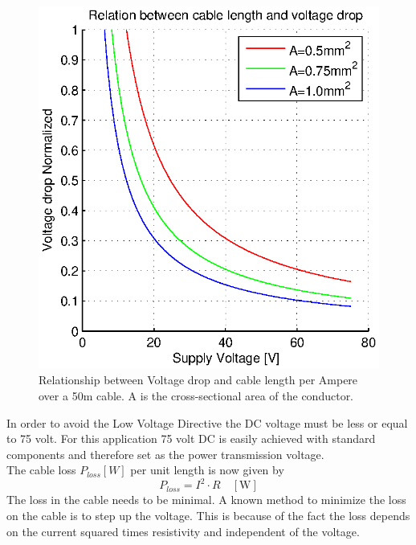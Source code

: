 \begin{figure}[hbtp]
\centering
\includegraphics[scale=0.75]{graphics/matlab/cable_relation_voltage_drop.eps}
\caption[Relationship between Voltage drop and cable length per Ampere]{Relationship between Voltage drop and cable length per Ampere over a 50m cable. A is the cross-sectional area of the conductor.}
\label{fig:relation_voltage_drop}
\end{figure}

\noindent
In order to avoid the Low Voltage Directive \cite{Parliament2006} the DC voltage must be less or equal to 75 volt. For this application 75 volt DC is easily achieved with standard components and therefore set as the power transmission voltage. \\

\noindent
The cable loss $P_{loss}[W]$ per unit length is now given by
\begin{equation}
P_{loss} = I^2 \cdot R \quad [\mathrm{W}]
\end{equation}
\noindent
The loss in the cable needs to be minimal. A known method to minimize the loss on the cable is to step up the voltage. This is because of the fact the loss depends on the current squared times resistivity and independent of the voltage. 


